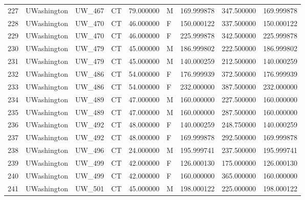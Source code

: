 \begin{tabular}{llllrlrrr}
227    &     UWashington &       UW\_467 &                 CT &  79.000000 &        M &       169.999878 &    347.500000 &  169.999878 \\
228    &     UWashington &       UW\_470 &                 CT &  46.000000 &        F &       150.000122 &    337.500000 &  150.000122 \\
229    &     UWashington &       UW\_470 &                 CT &  46.000000 &        F &       225.999878 &    342.500000 &  225.999878 \\
230    &     UWashington &       UW\_479 &                 CT &  45.000000 &        M &       186.999802 &    222.500000 &  186.999802 \\
231    &     UWashington &       UW\_479 &                 CT &  45.000000 &        M &       140.000259 &    212.500000 &  140.000259 \\
232    &     UWashington &       UW\_486 &                 CT &  54.000000 &        F &       176.999939 &    372.500000 &  176.999939 \\
233    &     UWashington &       UW\_486 &                 CT &  54.000000 &        F &       232.000000 &    387.500000 &  232.000000 \\
234    &     UWashington &       UW\_489 &                 CT &  47.000000 &        M &       160.000000 &    227.500000 &  160.000000 \\
235    &     UWashington &       UW\_489 &                 CT &  47.000000 &        M &       160.000000 &    287.500000 &  160.000000 \\
236    &     UWashington &       UW\_492 &                 CT &  48.000000 &        F &       140.000259 &    248.750000 &  140.000259 \\
237    &     UWashington &       UW\_492 &                 CT &  48.000000 &        F &       169.999878 &    292.500000 &  169.999878 \\
238    &     UWashington &       UW\_496 &                 CT &  24.000000 &        M &       195.999741 &    237.500000 &  195.999741 \\
239    &     UWashington &       UW\_499 &                 CT &  42.000000 &        F &       126.000130 &    175.000000 &  126.000130 \\
240    &     UWashington &       UW\_499 &                 CT &  42.000000 &        F &       160.000000 &    365.000000 &  160.000000 \\
241    &     UWashington &       UW\_501 &                 CT &  45.000000 &        M &       198.000122 &    225.000000 &  198.000122 \\
\bottomrule
\end{tabular}
